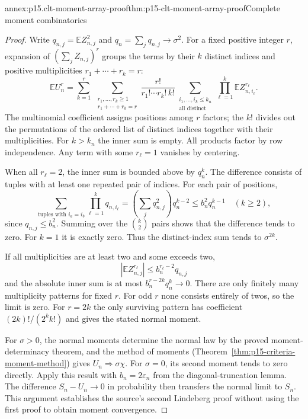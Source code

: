 \begin{annexitem}{annex:p15.clt-moment-array-proof}{thm:p15-clt-moment-array-proof}{Complete moment combinatorics}
\begin{proof}
Write \(q_{n,j}=\mathbb EZ_{n,j}^2\) and
\(q_n=\sum_jq_{n,j}\to\sigma^2\).
For a fixed positive integer \(r\), expansion of
\((\sum_jZ_{n,j})^r\) groups the terms by their \(k\)
distinct indices and positive multiplicities
\(r_1+\cdots+r_k=r\):
\[
 \mathbb EU_n^r
 =\sum_{k=1}^r\ 
   \sum_{\substack{r_1,\ldots,r_k\geq1\\r_1+\cdots+r_k=r}}
 \frac{r!}{r_1!\cdots r_k!\,k!}
 \sum_{\substack{i_1,\ldots,i_k\leq k_n\\\text{all distinct}}}
      \prod_{\ell=1}^k\mathbb EZ_{n,i_\ell}^{r_\ell}.
 \]
The multinomial coefficient assigns positions among \(r\) factors;
the \(k!\) divides out the permutations of the ordered list of
distinct indices together with their multiplicities.
For \(k>k_n\) the inner sum is empty.
All products factor by row independence.
Any term with some \(r_\ell=1\) vanishes by centering.

When all \(r_\ell=2\), the inner sum is bounded above by
\(q_n^k\). The difference consists of tuples with at least
one repeated pair of indices. For each pair of positions,
\[
 \sum_{\text{tuples with }i_a=i_b}
             \prod_{\ell=1}^kq_{n,i_\ell}
 =\left(\sum_jq_{n,j}^2\right)q_n^{k-2}
 \leq b_n^2q_n^{k-1}\quad(k\geq2),
 \]
since \(q_{n,j}\leq b_n^2\). Summing over the
\(\binom{k}{2}\) pairs shows that the difference tends to zero.
For \(k=1\) it is exactly zero. Thus the distinct-index sum
tends to \(\sigma^{2k}\).

If all multiplicities are at least two and some exceeds two,
\[
 \left|\mathbb EZ_{n,j}^{r_\ell}\right|
 \leq b_n^{r_\ell-2}q_{n,j}
 \]
and the absolute inner sum is at most
\(b_n^{r-2k}q_n^k\to0\).
There are only finitely many multiplicity patterns for fixed \(r\).
For odd \(r\) none consists entirely of twos, so the limit is zero.
For \(r=2k\) the only surviving pattern has coefficient
\((2k)!/(2^kk!)\) and gives the stated normal moment.

For \(\sigma>0\), the normal moments determine the normal law by
the proved moment-determinacy theorem, and the method of moments
(Theorem~\ref{thm:p15-criteria-moment-method}) gives
\(U_n\Rightarrow\sigma\chi\).
For \(\sigma=0\), its second moment tends to zero directly.
Apply this result with \(b_n=2\varepsilon_n\) from the
diagonal-truncation lemma. The difference \(S_n-U_n\to0\) in
probability then transfers the normal limit to \(S_n\).
This argument establishes the source's second Lindeberg proof
without using the first proof to obtain moment convergence.
\end{proof}
\end{annexitem}

